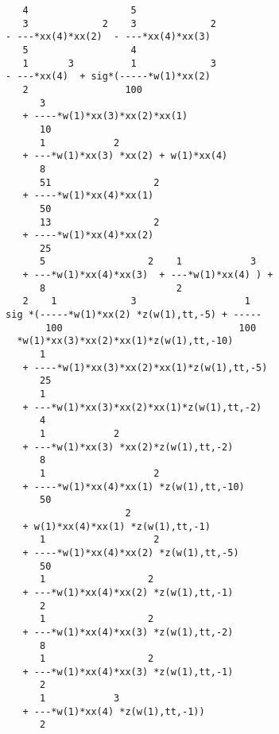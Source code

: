 \documentclass[11pt,a5paper]{article}
\begin{document}
\begin{verbatim}
                4                  5
                3             2    3             2
             - ---*xx(4)*xx(2)  - ---*xx(4)*xx(3)
                5                  4
                1       3          1             3
             - ---*xx(4)  + sig*(-----*w(1)*xx(2)
                2                 100
                   3
                + ----*w(1)*xx(3)*xx(2)*xx(1)
                   10
                   1            2
                + ---*w(1)*xx(3) *xx(2) + w(1)*xx(4)
                   8
                   51                  2
                + ----*w(1)*xx(4)*xx(1)
                   50
                   13                  2
                + ----*w(1)*xx(4)*xx(2)
                   25
                   5                  2    1            3
                + ---*w(1)*xx(4)*xx(3)  + ---*w(1)*xx(4) ) +
                   8                       2
                2    1             3                   1
             sig *(-----*w(1)*xx(2) *z(w(1),tt,-5) + -----
                    100                               100
               *w(1)*xx(3)*xx(2)*xx(1)*z(w(1),tt,-10)
                   1
                + ----*w(1)*xx(3)*xx(2)*xx(1)*z(w(1),tt,-5)
                   25
                   1
                + ---*w(1)*xx(3)*xx(2)*xx(1)*z(w(1),tt,-2)
                   4
                   1            2
                + ---*w(1)*xx(3) *xx(2)*z(w(1),tt,-2)
                   8
                   1                   2
                + ----*w(1)*xx(4)*xx(1) *z(w(1),tt,-10)
                   50
                                  2
                + w(1)*xx(4)*xx(1) *z(w(1),tt,-1)
                   1                   2
                + ----*w(1)*xx(4)*xx(2) *z(w(1),tt,-5)
                   50
                   1                  2
                + ---*w(1)*xx(4)*xx(2) *z(w(1),tt,-1)
                   2
                   1                  2
                + ---*w(1)*xx(4)*xx(3) *z(w(1),tt,-2)
                   8
                   1                  2
                + ---*w(1)*xx(4)*xx(3) *z(w(1),tt,-1)
                   2
                   1            3
                + ---*w(1)*xx(4) *z(w(1),tt,-1))
                   2


\end{verbatim}
\end{document}
